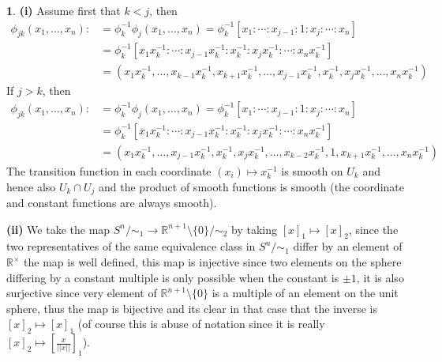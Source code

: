 \documentclass[10.5pt]{article}
\theoremstyle{definition}
\newtheorem{pb}{}
\newcommand{\set}[1]{\{#1\}}
\newcommand{\norm}[1]{\lvert\lvert#1\rvert\rvert}
\begin{document}
    \begin{pb}
        \textbf{(i)} Assume first that \(k<j\), then
        \begin{align*}
            \phi_{jk}(x_1,\hdots,x_n) :&= \phi_k^{-1}\phi_j(x_1,\hdots,x_n) = \phi_k^{-1}[x_1:\cdots:x_{j-1}:1:x_j:\cdots:x_n] \\
            &= \phi_k^{-1}[x_1x_k^{-1}:\cdots:x_{j-1}x_k^{-1}:x_k^{-1}:x_jx_k^{-1}:\cdots:x_nx_k^{-1}] \\
            &= (x_1x_k^{-1},\hdots,x_{k-1}x_k^{-1},x_{k+1}x_k^{-1},\hdots,x_{j-1}x_k^{-1},x_k^{-1},x_jx_k^{-1},\hdots,x_nx_k^{-1})
        \end{align*}
        If \(j > k\), then
        \begin{align*}
            \phi_{jk}(x_1,\hdots,x_n) :&= \phi_k^{-1}\phi_j(x_1,\hdots,x_n) = \phi_k^{-1}[x_1:\cdots:x_{j-1}:1:x_j:\cdots:x_n] \\
            &= \phi_k^{-1}[x_1x_k^{-1}:\cdots:x_{j-1}x_k^{-1}:x_k^{-1}:x_jx_k^{-1}:\cdots:x_nx_k^{-1}] \\
            &= (x_1x_k^{-1},\hdots,x_{j-1}x_k^{-1},x_k^{-1},x_jx_k^{-1},\hdots,x_{k-2}x_k^{-1},1,x_{k+1}x_k^{-1},\hdots,x_nx_k^{-1})
        \end{align*}
        The transition function in each coordinate \((x_i) \mapsto x_k^{-1}\) is smooth on \(U_k\) and hence also \(U_k \cap U_j\) and the product of smooth functions is smooth (the coordinate and constant functions are always smooth).

        \textbf{(ii)} We take the map \(S^n/\sim_1 \to \mathbb{R}^{n+1}\setminus\set{0}/\sim_2\) by taking \([x]_1 \mapsto [x]_2\), since the two representatives of the same equivalence class in \(S^n/\sim_1\) differ by an element of \(\mathbb{R}^\times\) the map is well defined, this map is injective since two elements on the sphere differing by a constant multiple is only possible when the constant is \(\pm 1\), it is also surjective since very element of \(\mathbb{R}^{n+1}\setminus\set{0}\) is a multiple of an element on the unit sphere, thus the map is bijective and its clear in that case that the inverse is \([x]_2 \mapsto [x]_1\) (of course this is abuse of notation since it is really \([x]_2 \mapsto \left[\frac{x}{\norm{x}}\right]_1\)).  


\end{pb}
\end{document}
